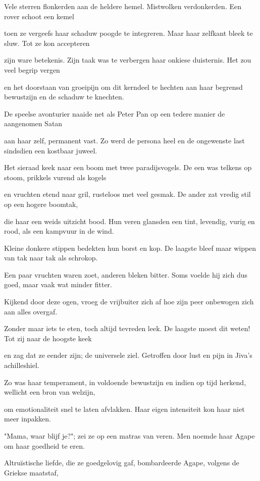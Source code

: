 Vele sterren flonkerden
aan de heldere hemel.
Mistwolken verdonkerden.
Een rover schoot een kemel

toen ze vergeefs haar schaduw
poogde te integreren.
Maar haar zelfkant bleek te sluw.
Tot ze kon accepteren

zijn ware betekenis.
Zijn taak was te verbergen
haar onkiese duisternis.
Het zou veel begrip vergen

en het doorstaan van groeipijn
om dit kerndeel te hechten
aan haar begrensd bewustzijn
en de schaduw te knechten.

De speelse avonturier
naaide net als Peter Pan
op een tedere manier
de aangenomen Satan

aan haar zelf, permanent vast.
Zo werd de persona heel
en de ongewenste last
sindsdien een kostbaar juweel.

Het sieraad keek naar een boom
met twee paradijsvogels.
De een was telkens op stoom,
prikkels vurend als kogels

en vruchten etend naar gril,
rusteloos met veel gesmak.
De ander zat vredig stil
op een hogere boomtak,

die haar een weids uitzicht bood.
Hun veren glansden een tint,
levendig, vurig en rood,
als een kampvuur in de wind.

Kleine donkere stippen
bedekten hun borst en kop.
De laagste bleef maar wippen
van tak naar tak als schrokop.

Een paar vruchten waren zoet,
anderen bleken bitter.
Soms voelde hij zich dus goed,
maar vaak wat minder fitter.

Kijkend door deze ogen,
vroeg de vrijbuiter zich af
hoe zijn peer onbewogen
zich aan alles overgaf.

Zonder maar iets te eten,
toch altijd tevreden leek.
De laagste moest dit weten!
Tot zij naar de hoogste keek

en zag dat ze eender zijn;
de universele ziel.
Getroffen door lust en pijn
in Jiva’s achilleshiel.

Zo was haar temperament,
in voldoende bewustzijn
en indien op tijd herkend,
wellicht een bron van welzijn,

om emotionaliteit
snel te laten afvlakken.
Haar eigen intensiteit
kon haar niet meer inpakken.

"Mama, waar blijf je?"; zei ze
op een matras van veren.
Men noemde haar Agape
om haar goedheid te eren.

Altruïstische liefde,
die ze goedgelovig gaf,
bombardeerde Agape,
volgens de Griekse maatstaf,

